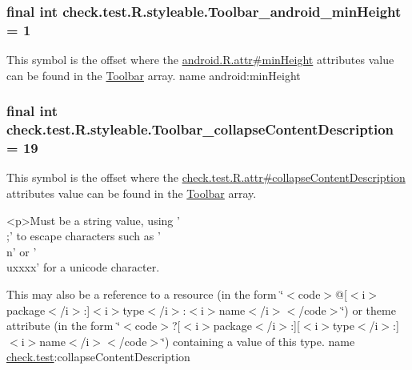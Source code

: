 \subsubsection[{Toolbar\+\_\+android\+\_\+min\+Height}]{\setlength{\rightskip}{0pt plus 5cm}final int check.\+test.\+R.\+styleable.\+Toolbar\+\_\+android\+\_\+min\+Height = 1\hspace{0.3cm}{\ttfamily [static]}}\label{classcheck_1_1test_1_1_r_1_1styleable_a50d77cb71359f8a286d3bcd9212afde6}
This symbol is the offset where the \hyperlink{}{android.\+R.\+attr\#min\+Height} attribute\textquotesingle{}s value can be found in the \hyperlink{classcheck_1_1test_1_1_r_1_1styleable_a1a7fa90223693abef77e7484cca2df54}{Toolbar} array.  name android\+:min\+Height \hypertarget{classcheck_1_1test_1_1_r_1_1styleable_abd8a8ed6f421b71bedf016b8648abba2}{}
\subsubsection[{Toolbar\+\_\+collapse\+Content\+Description}]{\setlength{\rightskip}{0pt plus 5cm}final int check.\+test.\+R.\+styleable.\+Toolbar\+\_\+collapse\+Content\+Description = 19\hspace{0.3cm}{\ttfamily [static]}}\label{classcheck_1_1test_1_1_r_1_1styleable_abd8a8ed6f421b71bedf016b8648abba2}
This symbol is the offset where the \hyperlink{classcheck_1_1test_1_1_r_1_1attr_a831929bb7bfa05410b022034fa3b1d23}{check.\+test.\+R.\+attr\#collapse\+Content\+Description} attribute\textquotesingle{}s value can be found in the \hyperlink{classcheck_1_1test_1_1_r_1_1styleable_a1a7fa90223693abef77e7484cca2df54}{Toolbar} array.

\begin{DoxyVerb}      <p>Must be a string value, using '\\;' to escape characters such as '\\n' or '\\uxxxx' for a unicode character.
\end{DoxyVerb}
 

This may also be a reference to a resource (in the form \char`\"{}$<$code$>$@\mbox{[}$<$i$>$package$<$/i$>$\+:\mbox{]}$<$i$>$type$<$/i$>$\+:$<$i$>$name$<$/i$>$$<$/code$>$\char`\"{}) or theme attribute (in the form \char`\"{}$<$code$>$?\mbox{[}$<$i$>$package$<$/i$>$\+:\mbox{]}\mbox{[}$<$i$>$type$<$/i$>$\+:\mbox{]}$<$i$>$name$<$/i$>$$<$/code$>$\char`\"{}) containing a value of this type.  name \hyperlink{namespacecheck_1_1test}{check.\+test}\+:collapse\+Content\+Description \hypertarget{classcheck_1_1test_1_1_r_1_1styleable_a768d406fdf51c661de7d2c032a071146}{}
